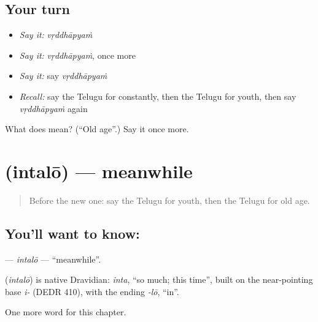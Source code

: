 \subsection*{Your turn}
\begin{itemize}
\raggedright
  \item \emph{Say it:} \emph{vṛddhāpyaṁ}
  \item \emph{Say it:} \emph{vṛddhāpyaṁ}, once more
  \item \emph{Say it:} say \emph{vṛddhāpyaṁ}
  \item \emph{Recall:} say the Telugu for constantly, then the Telugu for youth, then say \emph{vṛddhāpyaṁ} again
\end{itemize}

\begin{tcolorbox}[breakable,colback=teal!4,colframe=teal!35!black,title={Before you move on}]
What does  mean? (\textquotedblleft{}Old age\textquotedblright{}.) Say it once more.
\end{tcolorbox}
\section[\texorpdfstring{\te{ఇంతలో} (intalō)}{ఇంతలో (intalō)}]{ (intalō) — meanwhile}

\label{lesson:TE-C172-intalo}



\begin{quote}
Before the new one: say the Telugu for youth, then the Telugu for old age.
\end{quote}

\subsection*{You'll want to know: }
\textbf{} — \emph{intalō} — \textquotedblleft{}meanwhile\textquotedblright{}.

\begin{cousinweb}
\textbf{} (\emph{intalō}) is native Dravidian: \emph{inta}, \textquotedblleft{}so much; this time\textquotedblright{}, built on the near-pointing base \emph{i-} (DEDR 410), with the ending \emph{-lō}, \textquotedblleft{}in\textquotedblright{}.
\end{cousinweb}

\begin{grammarlens}[title={What you've built}]
One more word for this chapter.
\end{grammarlens}

